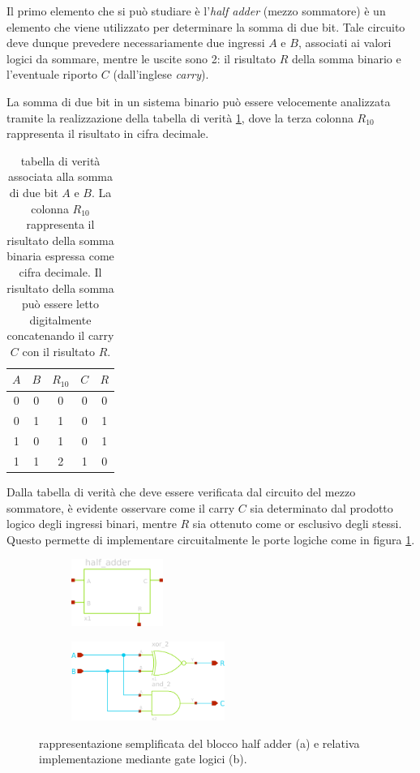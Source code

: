 	Il primo elemento che si può studiare è l'\textit{half adder} (mezzo sommatore) è un elemento che viene utilizzato per determinare la somma di due bit. Tale circuito deve dunque prevedere necessariamente due ingressi $A$ e $B$, associati ai valori logici da sommare, mentre le uscite sono 2: il risultato $R$ della somma binario e l'eventuale riporto $C$ (dall'inglese \textit{carry}).
	
	La somma di due bit in un sistema binario può essere velocemente analizzata tramite la realizzazione della tabella di verità \ref{tab:ha:tabella}, dove la terza colonna $R_{10}$ rappresenta il risultato in cifra decimale.
	
	\begin{table}[bht]
		\centering
		\begin{tabular}{c c | c | c c }
			$A$ & $B$ & $R_{10}$ & $C$ & $R$ \\ \hline
			0 & 0 & 0 & 0 & 0 \\	
			0 & 1 & 1 & 0 & 1 \\	
			1 & 0 & 1 & 0 & 1 \\
			1 & 1 & 2 & 1 & 0 \\		
		\end{tabular}
		\caption{tabella di verità associata alla somma di due bit $A$ e $B$. La colonna $R_{10}$ rappresenta il risultato della somma binaria espressa come cifra decimale. Il risultato della somma può essere letto digitalmente concatenando il carry $C$ con il risultato $R$.}
		\label{tab:ha:tabella}
	\end{table}
	
	Dalla tabella di verità che deve essere verificata dal circuito del mezzo sommatore, è evidente osservare come il carry $C$ sia determinato dal prodotto logico degli ingressi binari, mentre $R$ sia ottenuto come or esclusivo degli stessi. Questo permette di implementare circuitalmente le porte logiche come in figura \ref{fig:ha:sch}.
	
	\begin{figure}[bht]
		\centering
		\begin{subfigure}{0.48\linewidth}
			\centering
			\includegraphics[width=3cm]{Immagini/half-adder}
			\caption{}
		\end{subfigure}
		\begin{subfigure}{0.48\linewidth}
			\centering
			\includegraphics[width=5cm]{Immagini/half-adder-sch}
			\caption{}
		\end{subfigure}
		\caption{rappresentazione semplificata del blocco half adder (a) e relativa implementazione mediante gate logici (b).}
		\label{fig:ha:sch}
	\end{figure}
	
